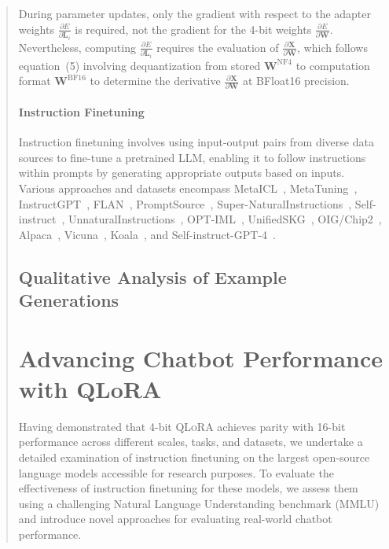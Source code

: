 \begin{quote}
During parameter updates, only the gradient with respect to the adapter weights $\frac{\partial E}{\partial \mathbf{L}_i}$ is required, not the gradient for the 4-bit weights $\frac{\partial E}{\partial \mathbf{W}}$. Nevertheless, computing $\frac{\partial E}{\partial \mathbf{L}_i}$ requires the evaluation of $\frac{\partial \mathbf{X}}{\partial \mathbf{W}}$, which follows equation~(5) involving dequantization from stored $\mathbf{W}^{\text{NF4}}$ to computation format $\mathbf{W}^{\text{BF16}}$ to determine the derivative $\frac{\partial \mathbf{X}}{\partial \mathbf{W}}$ at BFloat16 precision.

\paragraph{Instruction Finetuning} Instruction finetuning involves using input-output pairs from diverse data sources to fine-tune a pretrained LLM, enabling it to follow instructions within prompts by generating appropriate outputs based on inputs. Various approaches and datasets encompass MetaICL~\citep{min2021metaicl}, MetaTuning~\citep{zhong2021adapting}, InstructGPT~\citep{ouyang2022training}, FLAN~\citep{wei2021finetuned,chung2022scaling}, PromptSource~\citep{bach2022promptsource}, Super-NaturalInstructions~\citep{wang2022super,sanh2021multitask}, Self-instruct~\citep{wang2022self}, UnnaturalInstructions~\citep{honovich2022unnatural}, OPT-IML~\citep{iyer2022opt}, UnifiedSKG~\citep{xie2022unifiedskg}, OIG/Chip2~\citep{laion2023}, Alpaca~\citep{alpaca}, Vicuna~\citep{vicuna2023}, Koala~\citep{koala_blogpost_2023}, and Self-instruct-GPT-4~\citep{peng2023instruction}.

\subsection{Qualitative Analysis of Example Generations}
\label{ssec:examples}

\section{Advancing Chatbot Performance with QLoRA}
\label{sec:pushing}
Having demonstrated that 4-bit \textsc{QLoRA} achieves parity with 16-bit performance across different scales, tasks, and datasets, we undertake a detailed examination of instruction finetuning on the largest open-source language models accessible for research purposes. To evaluate the effectiveness of instruction finetuning for these models, we assess them using a challenging Natural Language Understanding benchmark (MMLU) and introduce novel approaches for evaluating real-world chatbot performance.


\end{quote}

